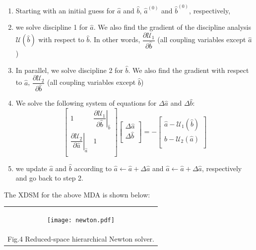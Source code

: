 \documentclass[11pt]{article}
\providecommand{\tightlist}{%
      \setlength{\itemsep}{0pt}\setlength{\parskip}{0pt}}
\begin{document}
\begin{enumerate}
\def\labelenumi{\arabic{enumi})}
\tightlist
\item
  Starting with an initial guess for \(\hat{a}\) and \(\hat{b}\),
  \(\hat{a}^{(0)}\) and \(\hat{b}^{(0)}\), respectively,
\item
  we solve discipline 1 for \(\hat{a}\). We also find the gradient of
  the discipline analysis \(\mathcal{U}(\hat{b})\) with respect to
  \(\hat{b}\). In other words,
  \(\dfrac{\partial\mathcal{U}_1}{\partial\hat{b}}\) (all coupling
  variables except \(\hat{a}\))
\item
  In parallel, we solve discipline 2 for \(\hat{b}\). We also find the
  gradient with respect to \(\hat{a}\),
  \(\dfrac{\partial\mathcal{U}_2}{\partial\hat{b}}\) (all coupling
  variables except \(\hat{b}\))
\item
  We solve the following system of equations for \(\Delta\hat{a}\) and
  \(\Delta\hat{b}\): \[
  \begin{bmatrix}
   1       & \left.\dfrac{\partial\mathcal{U}_1}{\partial\hat{b}}\right|_{\hat{b}}  \\
   \left.\dfrac{\partial\mathcal{U}_2}{\partial\hat{a}}\right|_{\hat{a}}        & 1  \\
  \end{bmatrix}
  \begin{bmatrix}
   \Delta\hat{a}\\
   \Delta\hat{b}\\
  \end{bmatrix} = -
  \begin{bmatrix}
   \hat{a} - \mathcal{U}_1(\hat{b})\\
   \hat{b} - \mathcal{U}_2(\hat{a})\\
  \end{bmatrix}
  \]
\item
  we update \(\hat{a}\) and \(\hat{b}\) according to
  \(\hat{a} \gets \hat{a} + \Delta\hat{a}\) and
  \(\hat{a} \gets \hat{a} + \Delta\hat{a}\), respectively and go back to
  step 2.
\end{enumerate}

The XDSM for the above MDA is shown below:

\begin{longtable}[]{@{}c@{}}
\toprule
\endhead
\begin{minipage}[t]{0.97\columnwidth}\centering
    \begin{figure}
        \centering
        \texttt{[image: newton.pdf]}
    \end{figure}
\end{minipage}\tabularnewline
Fig.4 Reduced-space hierarchical Newton solver.\tabularnewline
\bottomrule
\end{longtable}
\end{document}
